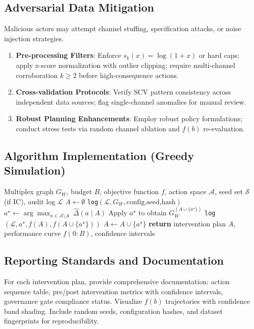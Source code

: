 \documentclass[12pt]{article}
\theoremstyle{plain}
\begin{document}
\subsection{Adversarial Data Mitigation}
Malicious actors may attempt channel stuffing, specification attacks, or noise injection strategies.
\begin{enumerate}\itemsep0.2em
\item \textbf{Pre-processing Filters}: Enforce $s_k(x)=\log(1+x)$ or hard caps; apply z-score normalization with outlier clipping; require multi-channel corroboration $k\ge2$ before high-consequence actions.
\item \textbf{Cross-validation Protocols}: Verify SCV pattern consistency across independent data sources; flag single-channel anomalies for manual review.
\item \textbf{Robust Planning Enhancements}: Employ robust policy formulations; conduct stress tests via random channel ablation and $f(b)$ re-evaluation.
\end{enumerate}

\subsection{Algorithm Implementation (Greedy Simulation)}
\begin{algorithm}[H]
\caption{Greedy Intervention Simulation with Comprehensive Auditing}
\begin{algorithmic}[1]
\REQUIRE Multiplex graph $G_W$, budget $B$, objective function $f$, action space $\mathcal{A}$, seed set $\mathcal{S}$ (if IC), audit log $\mathcal{L}$
\STATE $A\leftarrow\emptyset$ 
\STATE \texttt{log}$(\mathcal{L}, G_W,\text{config,seed,hash})$ 
  \STATE $a^\star\leftarrow\arg\max_{a\in\mathcal{A}\setminus A}\ \widehat{\Delta}(a\mid A)$ 
  \STATE Apply $a^\star$ to obtain $G_W^{(A\cup\{a^\star\})}$
  \STATE \texttt{log}$(\mathcal{L}, a^\star, f(A), f(A\cup\{a^\star\}))$ 
  \STATE $A\leftarrow A\cup\{a^\star\}$ 
\ENDFOR
\STATE \textbf{return} intervention plan $A$, performance curve $f(0{:}B)$, confidence intervals
\end{algorithmic}
\end{algorithm}

\subsection{Reporting Standards and Documentation}
For each intervention plan, provide comprehensive documentation: action sequence table, pre/post intervention metrics with confidence intervals, governance gate compliance status. Visualize $f(b)$ trajectories with confidence band shading. Include random seeds, configuration hashes, and dataset fingerprints for reproducibility.
\end{document}
